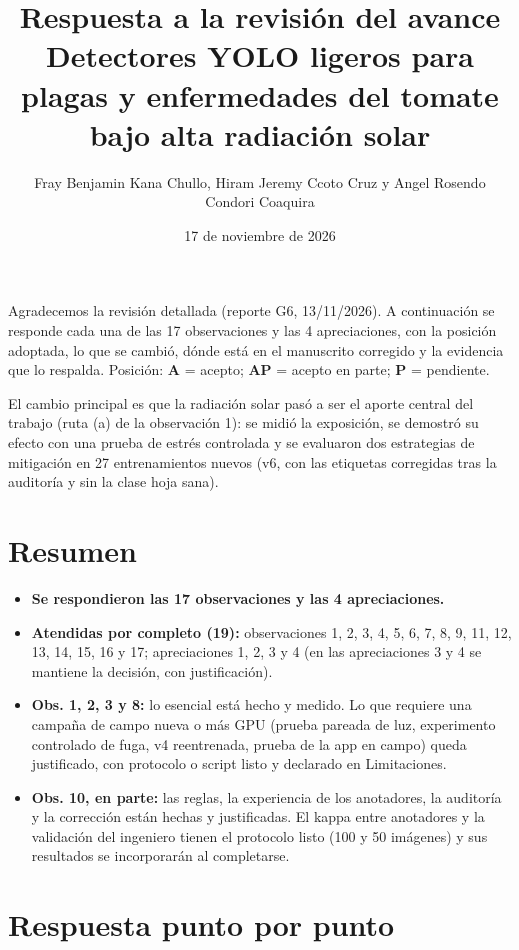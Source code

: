 \documentclass[11pt,a4paper]{article}
\title{Respuesta a la revisión del avance\\\large Detectores YOLO ligeros para plagas y enfermedades del tomate bajo alta radiación solar}
\author{Fray Benjamin Kana Chullo, Hiram Jeremy Ccoto Cruz y Angel Rosendo Condori Coaquira}
\date{17 de noviembre de 2026}
\begin{document}
\maketitle
Agradecemos la revisión detallada (reporte G6, 13/11/2026). A continuación se responde cada una de las 17 observaciones y las 4 apreciaciones, con la posición adoptada, lo que se cambió, dónde está en el manuscrito corregido y la evidencia que lo respalda. Posición: \textbf{A} = acepto; \textbf{AP} = acepto en parte; \textbf{P} = pendiente.

El cambio principal es que la radiación solar pasó a ser el aporte central del trabajo (ruta (a) de la observación 1): se midió la exposición, se demostró su efecto con una prueba de estrés controlada y se evaluaron dos estrategias de mitigación en 27 entrenamientos nuevos (v6, con las etiquetas corregidas tras la auditoría y sin la clase hoja sana).

\section*{Resumen}
\begin{itemize}
\item \textbf{Se respondieron las 17 observaciones y las 4 apreciaciones.}
\item \textbf{Atendidas por completo (19):} observaciones 1, 2, 3, 4, 5, 6, 7, 8, 9, 11, 12, 13, 14, 15, 16 y 17; apreciaciones 1, 2, 3 y 4 (en las apreciaciones 3 y 4 se mantiene la decisión, con justificación).
\item \textbf{Obs. 1, 2, 3 y 8:} lo esencial está hecho y medido. Lo que requiere una campaña de campo nueva o más GPU (prueba pareada de luz, experimento controlado de fuga, v4 reentrenada, prueba de la app en campo) queda justificado, con protocolo o script listo y declarado en Limitaciones.
\item \textbf{Obs. 10, en parte:} las reglas, la experiencia de los anotadores, la auditoría y la corrección están hechas y justificadas. El kappa entre anotadores y la validación del ingeniero tienen el protocolo listo (100 y 50 imágenes) y sus resultados se incorporarán al completarse.
\end{itemize}

\section*{Respuesta punto por punto}
\end{document}
